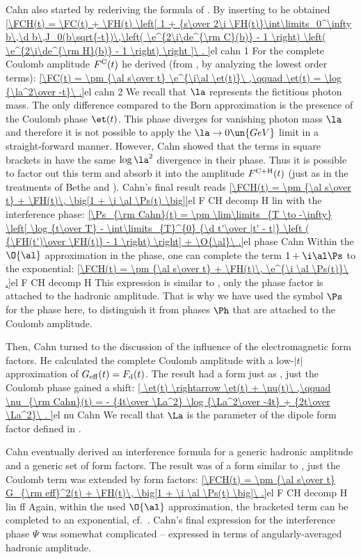 Cahn  also started by rederiving the formula of \WY. By inserting  to  he obtained
\eqref{\FCH(t) = \FC(t)
+ \FH(t) \left[ 1 +
{s\over 2\i \FH(t)}\int\limits_0^\infty b\,\d b\,J_0(b\sqrt{-t})\,\left( \e^{2\i\de^{\rm C}(b)} - 1 \right) \left( \e^{2\i\de^{\rm H}(b)} - 1 \right)
\right ]\ .
}{el cahn 1}
For the complete Coulomb amplitude $F^{\rm C}(t)$ he derived (from , by analyzing the lowest order terms):
\eqref{\FC(t) = \pm {\al s\over t} \e^{\i\al \et(t)}\ ,\qquad \et(t) = \log {\la^2\over -t}\ .}{el cahn 2}
We recall that $\la$ represents the fictitious photon mass. The only difference compared to the Born approximation  is the presence of the Coulomb phase $\et(t)$. This phase diverges for vanishing photon mass $\la$ and therefore it is not possible to apply the $\la\to 0\un{GeV}$ limit in a straight-forward manner. However, Cahn showed that the terms in square brackets in  have the same $\log\la^2$ divergence in their phase. Thus it is possible to factor out this term and absorb it into the amplitude $F^{\rm C+H}(t)$ (just as in the treatments of Bethe and \WY). Cahn's final result reads
\eqref{\FCH(t) = \pm {\al s\over t} + \FH(t)\, \big[1 + \i \al \Ps(t) \big]}{el F CH decomp H lin}
with the interference phase:
\eqref{\Ps_{\rm Cahn}(t) = \pm \lim\limits_{T \to -\infty} \left[ \log {t\over T} - \int\limits_{T}^{0} {\d t'\over |t' - t|} \left ( {\FH(t')\over \FH(t)} - 1 \right) \right] + \O{\al}\ .}{el phase Cahn}
Within the $\O{\al}$ approximation in the phase, one can complete the term $1+\i\al\Ps$ to the exponential:
\eqref{\FCH(t) = \pm {\al s\over t} + \FH(t)\, \e^{\i \al \Ps(t)}\ .}{el F CH decomp H}
This expression is similar to , only the phase factor is attached to the hadronic amplitude. That is why we have used the symbol $\Ps$ for the phase here, to distinguish it from phases $\Ph$ that are attached to the Coulomb amplitude.

Then, Cahn turned to the discussion of the influence of the electromagnetic form factors. He calculated the complete Coulomb amplitude with a low-$|t|$ approximation of $G_{\rm eff}(t) = F_{\rm d}(t)$. The result had a form just as , just the Coulomb phase gained a shift:
\eqref{
	\et(t) \rightarrow \et(t) + \nu(t)\ ,\qquad
	\nu_{\rm Cahn}(t) = - {4t\over \La^2} \log {\La^2\over -4t} + {2t\over \La^2}\ .
}{el nu Cahn}
We recall that $\La$ is the parameter of the dipole form factor defined in .

Cahn eventually derived an interference formula for a generic hadronic amplitude and a generic set of form factors. The result was of a form similar to , just the Coulomb term was extended by form factors:
\eqref{\FCH(t) = \pm {\al s\over t} G_{\rm eff}^2(t) + \FH(t)\, \big[1 + \i \al \Ps(t) \big]\ .}{el F CH decomp H lin ff}
Again, within the used $\O{\al}$ approximation, the bracketed term can be completed to an exponential, cf.~. Cahn's final expression for the interference phase $\Psi$ was somewhat complicated -- expressed in terms of angularly-averaged hadronic amplitude.

